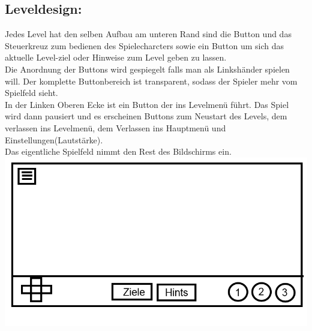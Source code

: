 \documentclass{scrartcl}
\begin{document}
\begin{enumerate}
	\begin{minipage}{1\textwidth}
		\item \subsection*{Leveldesign:} \label{appaufbau:Leveldesign}
		Jedes Level  hat den selben Aufbau am unteren Rand sind die Button und das Steuerkreuz zum bedienen des Spielecharcters sowie ein Button um sich das aktuelle Level-ziel oder Hinweise zum Level geben zu lassen.\\ Die Anordnung der Buttons wird gespiegelt falls man als Linkshänder spielen will. Der komplette Buttonbereich ist transparent, sodass der Spieler mehr vom Spielfeld sieht.\\
		In der Linken Oberen Ecke ist ein Button der ins Levelmenü führt. Das Spiel wird dann pausiert und es erscheinen Buttons zum Neustart des Levels, dem verlassen ins Levelmenü, dem Verlassen ins Hauptmenü und Einstellungen(Lautstärke).\\
		Das eigentliche Spielfeld nimmt den Rest des Bildschirms ein.\\
		\includegraphics[width=\textwidth]{assets/LevelDesign2}
	\end{minipage}
	

\end{enumerate}
\end{document}

